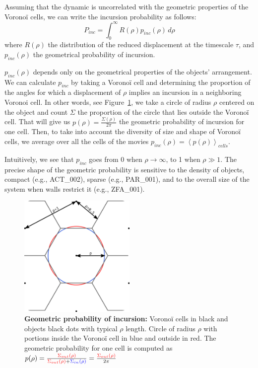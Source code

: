     Assuming that the dynamic is uncorrelated with the geometric properties of the Voronoï cells, we can write the incursion probability as follows:
    \begin{equation}
        P_{inc}=\int_{0}^{\infty} R(\rho)p_{inc}(\rho) \,d \rho
    \end{equation}
    where $R(\rho)$ the distribution of the reduced displacement at the timescale $\tau$, and $p_{inc}(\rho)$ the geometrical probability of incursion.

    $p_{inc}(\rho)$ depends only on the geometrical properties of the objects' arrangement. We can calculate $p_{inc}$ by taking a Voronoï cell and determining the proportion of the angles for which a displacement of $\rho$ implies an incursion in a neighboring Voronoi cell. In other words, see Figure~\ref{part_1:fig_pinc}, we take a circle of radius $\rho$ centered on the object and count $\Sigma$ the proportion of the circle that lies outside the Voronoï cell. That will give us $p(\rho)=\frac{\Sigma(\rho)}{2\pi}$ the geometric probability of incursion for one cell. Then, to take into account the diversity of size and shape of Voronoï cells, we average over all the cells of the movies $p_{inc}(\rho)=\left<p(\rho)\right>_{cells}$.

    Intuitively, we see that $p_{inc}$ goes from 0 when $\rho \to \infty$, to 1 when $\rho \gg 1$. The precise shape of the geometric probability is sensitive to the density of objects, compact (e.g., ACT\_002), sparse (e.g., PAR\_001), and to the overall size of the system when walls restrict it (e.g., ZFA\_001).

	\begin{figure}[h!]
    \centering
    \includegraphics[width=0.5\textwidth]{part_1/assets/Figure_pinc.png}
    \caption{\textbf{Geometric probability of incursion:} Voronoï cells in black and objects black dots with typical $\rho$ length. Circle of radius $\rho$ with portions inside the Voronoï cell in blue and outside in red. The geometric probability for one cell is computed as $p(\rho)=\frac{\color{red}{\Sigma_{out}(\rho)}}{\color{red}{\Sigma_{out}(\rho)} \color{black}{+}\color{blue}{\Sigma_{in}(\rho)}} = \frac{\color{red}{\Sigma_{out}(\rho)}}{2\pi}$}
    \label{part_1:fig_pinc}
    \end{figure}

